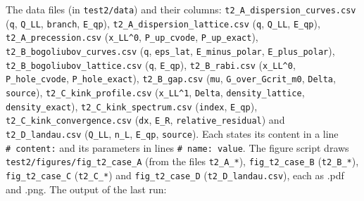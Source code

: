 \documentclass[
  10pt,
]{article}
\begin{document}
The data files (in \texttt{test2/data}) and their columns:
\texttt{t2\_A\_dispersion\_curves.csv} (\texttt{q}, \texttt{Q\_LL},
\texttt{branch}, \texttt{E\_qp}),
\texttt{t2\_A\_dispersion\_lattice.csv} (\texttt{q}, \texttt{Q\_LL},
\texttt{E\_qp}), \texttt{t2\_A\_precession.csv} (\texttt{x\_LL\^{}0},
\texttt{P\_up\_cvode}, \texttt{P\_up\_exact}),
\texttt{t2\_B\_bogoliubov\_curves.csv} (\texttt{q}, \texttt{eps\_lat},
\texttt{E\_minus\_polar}, \texttt{E\_plus\_polar}),
\texttt{t2\_B\_bogoliubov\_lattice.csv} (\texttt{q}, \texttt{E\_qp}),
\texttt{t2\_B\_rabi.csv} (\texttt{x\_LL\^{}0}, \texttt{P\_hole\_cvode},
\texttt{P\_hole\_exact}), \texttt{t2\_B\_gap.csv} (\texttt{mu},
\texttt{G\_over\_Gcrit\_m0}, \texttt{Delta}, \texttt{source}),
\texttt{t2\_C\_kink\_profile.csv} (\texttt{x\_LL\^{}1}, \texttt{Delta},
\texttt{density\_lattice}, \texttt{density\_exact}),
\texttt{t2\_C\_kink\_spectrum.csv} (\texttt{index}, \texttt{E\_qp}),
\texttt{t2\_C\_kink\_convergence.csv} (\texttt{dx}, \texttt{E\_R},
\texttt{relative\_residual}) and \texttt{t2\_D\_landau.csv}
(\texttt{Q\_LL}, \texttt{n\_L}, \texttt{E\_qp}, \texttt{source}). Each
states its content in a line \texttt{\#\ content:} and its parameters in
lines \texttt{\#\ name:\ value}. The figure script draws
\texttt{test2/figures/fig\_t2\_case\_A} (from the files
\texttt{t2\_A\_*}), \texttt{fig\_t2\_case\_B} (\texttt{t2\_B\_*}),
\texttt{fig\_t2\_case\_C} (\texttt{t2\_C\_*}) and
\texttt{fig\_t2\_case\_D} (\texttt{t2\_D\_landau.csv}), each as .pdf and
.png. The output of the last run:
\end{document}

